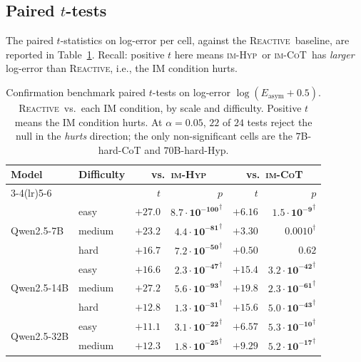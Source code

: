 \documentclass[11pt]{article}
\newcommand{\hurts}{\text{$\dagger$}}
\newcommand{\imhyp}{\textsc{im-Hyp}}
\newcommand{\imcot}{\textsc{im-CoT}}
\newcommand{\reactive}{\textsc{Reactive}}
\newcommand{\errk}{E_{\text{asym}}}
\begin{document}
\subsection{Paired $t$-tests}

The paired $t$-statistics on log-error per cell, against the
\reactive\ baseline, are reported in Table~\ref{tab:ttests-v2}.
Recall:  positive $t$ here means \imhyp\ or \imcot\ has
\emph{larger} log-error than \reactive, i.e., the IM condition
hurts.

\begin{table}[t]
\centering
\caption{Confirmation benchmark paired $t$-tests on log-error
$\log(\errk + 0.5)$.  \reactive\ vs.\ each IM condition, by scale
and difficulty.  Positive $t$ means the IM condition hurts.  At
$\alpha = 0.05$, $22$ of $24$ tests reject the null in the
\emph{hurts} direction; the only non-significant cells are the
$7$B-hard-CoT and $70$B-hard-Hyp.}
\label{tab:ttests-v2}
\small
\setlength{\tabcolsep}{4pt}
\begin{tabular}{l l rr rr}
\toprule
Model & Difficulty
  & \multicolumn{2}{c}{vs.\ \imhyp}
  & \multicolumn{2}{c}{vs.\ \imcot} \\
\cmidrule(lr){3-4}\cmidrule(lr){5-6}
 & & $t$ & $p$ & $t$ & $p$ \\
\midrule
\multirow{3}{*}{Qwen2.5-7B}
  & easy   & $+27.0$ & $\mathbf{8.7\!\cdot\!10^{-100}}^{\hurts}$ & $+6.16$ & $\mathbf{1.5\!\cdot\!10^{-9}}^{\hurts}$ \\
  & medium & $+23.2$ & $\mathbf{4.4\!\cdot\!10^{-81}}^{\hurts}$  & $+3.30$ & $\mathbf{0.0010}^{\hurts}$ \\
  & hard   & $+16.7$ & $\mathbf{7.2\!\cdot\!10^{-50}}^{\hurts}$  & $+0.50$ & $0.62$ \\
\multirow{3}{*}{Qwen2.5-14B}
  & easy   & $+16.6$ & $\mathbf{2.3\!\cdot\!10^{-47}}^{\hurts}$  & $+15.4$ & $\mathbf{3.2\!\cdot\!10^{-42}}^{\hurts}$ \\
  & medium & $+27.2$ & $\mathbf{5.6\!\cdot\!10^{-93}}^{\hurts}$  & $+19.8$ & $\mathbf{2.3\!\cdot\!10^{-61}}^{\hurts}$ \\
  & hard   & $+12.8$ & $\mathbf{1.3\!\cdot\!10^{-31}}^{\hurts}$  & $+15.6$ & $\mathbf{5.0\!\cdot\!10^{-43}}^{\hurts}$ \\
\multirow{3}{*}{Qwen2.5-32B}
  & easy   & $+11.1$ & $\mathbf{3.1\!\cdot\!10^{-22}}^{\hurts}$  & $+6.57$ & $\mathbf{5.3\!\cdot\!10^{-10}}^{\hurts}$ \\
  & medium & $+12.3$ & $\mathbf{1.8\!\cdot\!10^{-25}}^{\hurts}$  & $+9.29$ & $\mathbf{5.2\!\cdot\!10^{-17}}^{\hurts}$ \\

\end{tabular}
\end{table}
\end{document}
